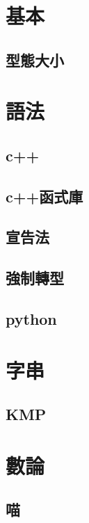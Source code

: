 \section{基本}
    \subsection{型態大小}
        
        
\section{語法}
    \subsection{c++}
        
    \subsection{c++函式庫}
        
    \subsection{宣告法}
        
    \subsection{強制轉型}
        
    \subsection{python}
        
        
\section{字串}
    \subsection{KMP}
        
    
\section{數論}
    \subsection{喵}
        
